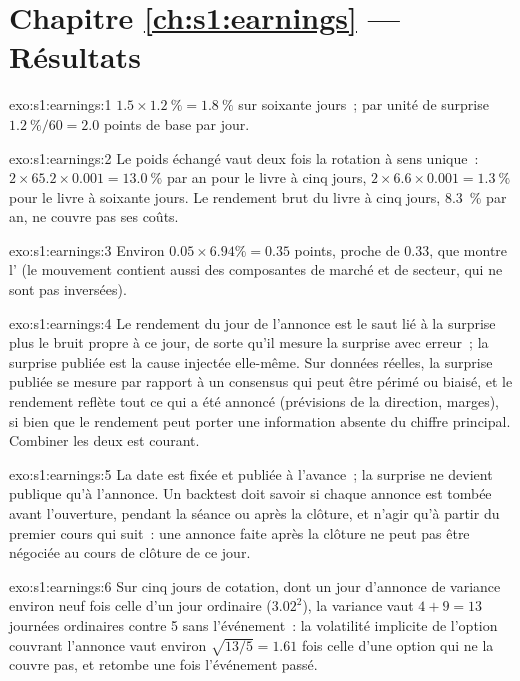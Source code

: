 \section*{Chapitre \ref{ch:s1:earnings} --- Résultats}

\begin{solution}{exo:s1:earnings:1}
$1.5 \times 1.2~\% = 1.8~\%$ sur soixante jours~; par unité de surprise $1.2~\%/60 = 2.0$ points de base par jour.
\end{solution}

\begin{solution}{exo:s1:earnings:2}
Le poids échangé vaut deux fois la rotation à sens unique~: $2 \times 65.2 \times 0.001 = 13.0~\%$ par an pour le livre à cinq jours, $2 \times 6.6 \times 0.001 = 1.3~\%$ pour
le livre à soixante jours. Le rendement brut du livre à cinq jours, 8.3~\% par an, ne couvre pas ses coûts.
\end{solution}

\begin{solution}{exo:s1:earnings:3}
Environ $0.05 \times 6.94\% = 0.35$ points, proche de 0.33, que montre l' (le mouvement contient aussi des composantes de marché et de secteur, qui ne sont pas inversées).
\end{solution}

\begin{solution}{exo:s1:earnings:4}
Le rendement du jour de l'annonce est le saut lié à la surprise plus le bruit propre à ce jour, de sorte qu'il mesure la surprise avec erreur~; la surprise publiée est la
cause injectée elle-même. Sur données réelles, la surprise publiée se mesure par rapport à un consensus qui peut être périmé ou biaisé, et le rendement reflète tout ce qui
a été annoncé (prévisions de la direction, marges), si bien que le rendement peut porter une information absente du chiffre principal. Combiner les deux est courant.
\end{solution}

\begin{solution}{exo:s1:earnings:5}
La date est fixée et publiée à l'avance~; la surprise ne devient publique qu'à l'annonce. Un backtest doit savoir si chaque annonce est tombée
avant l'ouverture, pendant la séance ou après la clôture, et n'agir qu'à partir du premier cours qui suit~: une annonce faite après la clôture ne peut pas être négociée au
cours de clôture de ce jour.
\end{solution}

\begin{solution}{exo:s1:earnings:6}
Sur cinq jours de cotation, dont un jour d'annonce de variance environ neuf fois celle d'un jour ordinaire ($3.02^2$), la variance vaut $4 + 9 = 13$ journées ordinaires
contre 5 sans l'événement~: la volatilité implicite de l'option couvrant l'annonce vaut environ $\sqrt{13/5} = 1.61$ fois celle d'une option qui ne
la couvre pas, et retombe une fois l'événement passé.
\end{solution}

